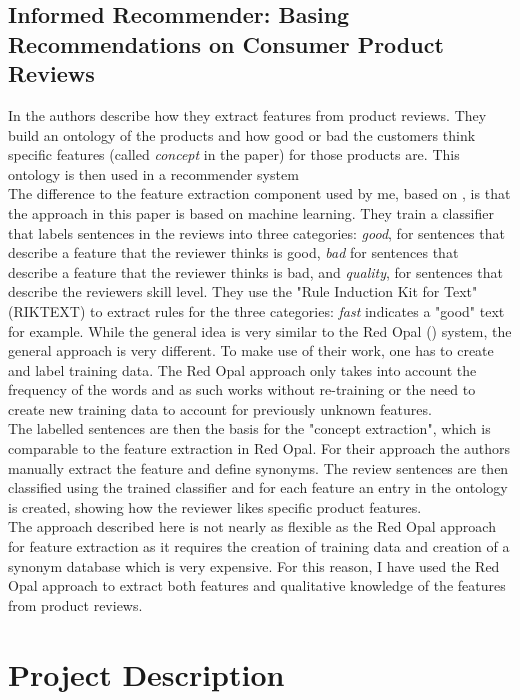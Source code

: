 \section{Informed Recommender: Basing Recommendations on Consumer Product Reviews}
In \cite{aciar2007informed} the authors describe how they extract features from product reviews. They build an ontology of the products and how good or bad the customers think specific features (called \textit{concept} in the paper) for those products are. This ontology is then used in a recommender system\\
The difference to the feature extraction component used by me, based on \cite{scaffidi2007red}, is that the approach in this paper is based on machine learning. They train a classifier that labels sentences in the reviews into three categories: \textit{good}, for sentences that describe a feature that the reviewer thinks is good, \textit{bad} for sentences that describe a feature that the reviewer thinks is bad, and \textit{quality}, for sentences that describe the reviewers skill level. They use the "Rule Induction Kit for Text" (RIKTEXT) to extract rules for the three categories: \textit{fast} indicates a "good" text for example.
While the general idea is very similar to the Red Opal (\cite{scaffidi2007red}) system, the general approach is very different. To make use of their work, one has to create and label training data. The Red Opal approach only takes into account the frequency of the words and as such works without re-training or the need to create new training data to account for previously unknown features.\\
The labelled sentences are then the basis for the "concept extraction", which is comparable to the feature extraction in Red Opal. For their approach the authors manually extract the feature and define synonyms. The review sentences are then classified using the trained classifier and for each feature an entry in the ontology is created, showing how the reviewer likes specific product features.\\
The approach described here is not nearly as flexible as the Red Opal approach for feature extraction as it requires the creation of training data and creation of a synonym database which is very expensive. For this reason, I have used the Red Opal approach to extract both features and qualitative knowledge of the features from product reviews.

\chapter{Project Description}
\label{chapter:description}
